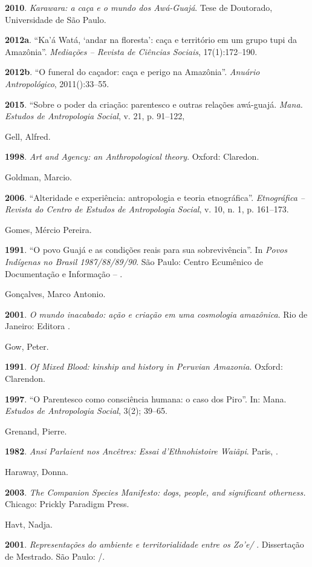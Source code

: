 \textbf{2010}. \emph{Karawara: a caça e o mundo dos Awá-Guajá}. Tese de
Doutorado, Universidade de São Paulo.

\textbf{2012a}. ``Ka'á Watá, `andar na floresta': caça e território em
um grupo tupi da Amazônia''. \emph{Mediações -- Revista de Ciências
Sociais}, 17(1):172--190.

\textbf{2012b}. ``O funeral do caçador: caça e perigo na Amazônia''.
\emph{Anuário Antropológico}, 2011():33--55.

\textbf{2015}. ``Sobre o poder da criação: parentesco e outras relações
awá-guajá. \emph{Mana. Estudos de Antropologia Social}, v. 21, p.
91--122,

Gell, Alfred.

\textbf{1998}. \emph{Art and Agency: an Anthropological theory}. Oxford:
Claredon.

Goldman, Marcio.

\textbf{2006}. ``Alteridade e experiência: antropologia e teoria
etnográfica''. \emph{Etnográfica -- Revista do Centro de Estudos de
Antropologia Social}, v. 10, n. 1, p. 161--173.

Gomes, Mércio Pereira.

\textbf{1991}. ``O povo Guajá e as condições reais para sua
sobrevivência''. In \emph{Povos Indígenas no Brasil 1987/88/89/90}. São
Paulo: Centro Ecumênico de Documentação e Informação -- .

Gonçalves, Marco Antonio.

\textbf{2001}. \emph{O mundo inacabado: ação e criação em uma cosmologia
amazônica}. Rio de Janeiro: Editora .

Gow, Peter.

\textbf{1991}. \emph{Of Mixed Blood: kinship and history in Peruvian
Amazonia}. Oxford: Clarendon.

\textbf{1997}. ``O Parentesco como consciência humana: o caso dos Piro''.
In: Mana. \emph{Estudos de Antropologia Social}, 3(2); 39--65.

Grenand, Pierre.

\textbf{1982}. \emph{Ansi Parlaient nos Ancêtres: Essai d'Ethnohistoire
Waiãpi}. Paris, .

Haraway, Donna.

\textbf{2003}. \emph{The Companion Species Manifesto: dogs, people, and
significant otherness.} Chicago: Prickly Paradigm Press.

Havt, Nadja.

\textbf{2001}. \emph{Representações do ambiente e territorialidade entre
os Zo'e/ }. Dissertação de Mestrado. São Paulo: /.

